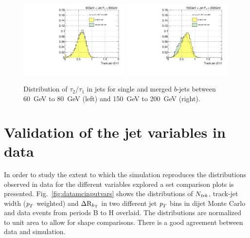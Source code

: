 \begin{figure}[tp]
\centering
\includegraphics[width=0.49\textwidth]{FIGS/VarsSingleMerged/TauRatio060.pdf}
\includegraphics[width=0.49\textwidth]{FIGS/VarsSingleMerged/TauRatio150.pdf}
\caption{Distribution of $\tau_2/\tau_1$ in jets for single and merged $b$-jets between 60~GeV to 80~GeV (left) and 150~GeV to 200~GeV (right).}
\label{fig:tauratiosinglemerged}
\end{figure}




\section{Validation of the jet variables in data}\label{sec:gbbValidation}
In order to study the extent to which the simulation reproduces the distributions observed in data for the different variables explored a set comparison plots is presented. Fig.~\ref{fig:datamcinputvars} shows the distributions of $N_{\it trk}$, track-jet width (${\emph{p}_{T}}$ weighted) and $\Delta {\rm R}_{k_{\rm T}}$ in two different jet ${\emph{p}_{T}}$ bins in dijet Monte Carlo and data events from periods B to H overlaid. The distributions are normalized to unit area to allow for shape comparisons. There is a good agreement between data and simulation. 

